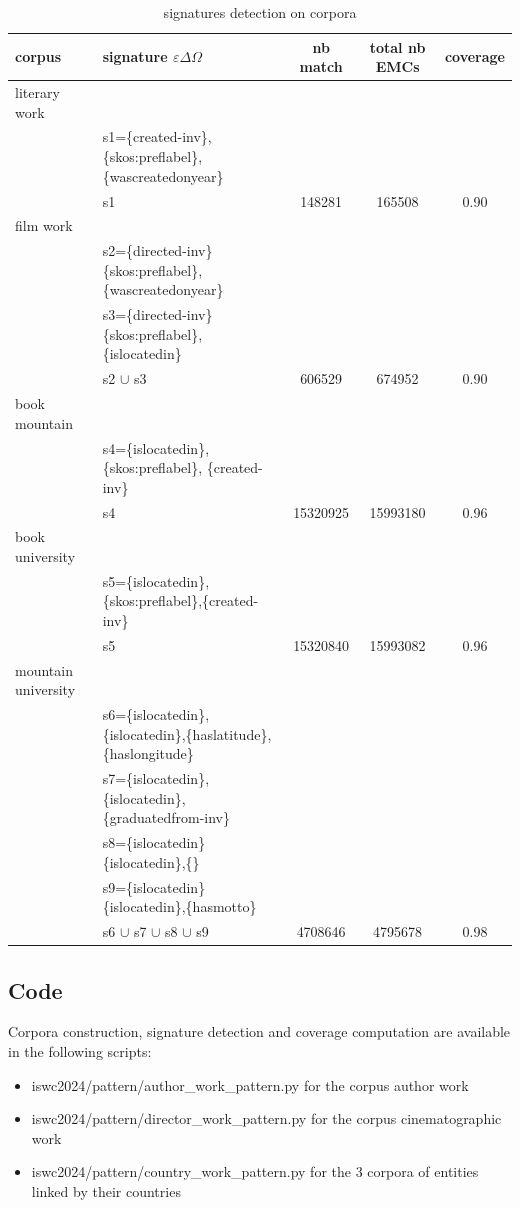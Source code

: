 \documentclass[runningheads]{llncs}
\begin{document}
\begin{table}[]
    \centering
    \begin{tabular}{l|l|c|c|c}
        \hline
         corpus & signature $\varepsilon\Delta\Omega$ & nb match & total nb EMCs & coverage   \\
         \hline
       literary work  & & & & \\
         & s1=\{created-inv\},\{skos:preflabel\},\{wascreatedonyear\}& & & \\
       \hline  
       & s1 & 148281 & 165508 & 0.90\\
       \hline
       film work & & & & \\  
       & s2=\{directed-inv\}\{skos:preflabel\},\{wascreatedonyear\} & & & \\
       & s3=\{directed-inv\}\{skos:preflabel\},\{islocatedin\} & & & \\
       \hline
        & s2 $\cup$ s3 & 606529 & 674952 & 0.90\\
       \hline
       \hline
       book mountain & & & & \\  
       & s4=\{islocatedin\},\{skos:preflabel\}, \{created-inv\}& & & \\
       \hline
       & s4 & 15320925 & 15993180 & 0.96\\
       \hline
       book university & & & &  \\
       & s5=\{islocatedin\},\{skos:preflabel\},\{created-inv\}& & & \\
       \hline
       & s5 & 15320840 & 15993082 & 0.96 \\
       \hline
       mountain university  & & & & \\
       & s6=\{islocatedin\},\{islocatedin\},\{haslatitude\}, \{haslongitude\}& & & \\
       &s7=\{islocatedin\},\{islocatedin\},\{graduatedfrom-inv\}& & & \\
       &s8=\{islocatedin\}\{islocatedin\},\{\}& & & \\
       &s9=\{islocatedin\}\{islocatedin\},\{hasmotto\}& & & \\
       \hline
       &s6 $\cup$ s7 $\cup$ s8 $\cup$ s9 & 4708646 & 4795678& 0.98\\
       \hline
    \end{tabular}
    \caption{signatures detection on corpora}
    \label{tab:signature_detection}
\end{table}

\subsection{Code}
Corpora construction, signature detection and coverage computation are available in the following scripts:
\begin{itemize}
	\item iswc2024/pattern/author\_work\_pattern.py for the corpus author work
	\item iswc2024/pattern/director\_work\_pattern.py for the corpus cinematographic work
	\item iswc2024/pattern/country\_work\_pattern.py for the 3 corpora of entities linked by their countries 
\end{itemize}
\end{document}
